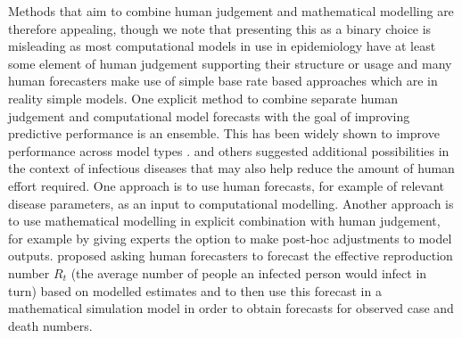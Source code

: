 \documentclass[10pt,a4paper,twocolumn]{article}
\begin{document}

Methods that aim to combine human judgement and mathematical modelling are therefore appealing, though we note that presenting this as a binary choice is misleading as most computational models in use in epidemiology have at least some element of human judgement supporting their structure or usage and many human forecasters make use of simple base rate based approaches which are in reality simple models. One explicit method to combine separate human judgement and computational model forecasts with the goal of improving predictive performance is an ensemble. This has been widely shown to improve performance across model types \citep{mcandrewChimericForecastingCombining2022}. \citet{farrowHumanJudgmentApproach2017, bosseComparingHumanModelbased2022, swallowChallengesEstimationUncertainty2022} and others suggested additional possibilities in the context of infectious diseases that may also help reduce the amount of human effort required. One approach is to use human forecasts, for example of relevant disease parameters, as an input to computational modelling. Another approach is to use mathematical modelling in explicit combination with human judgement, for example by giving experts the option to make post-hoc adjustments to model outputs. \citet{bosseComparingHumanModelbased2022} proposed asking human forecasters to forecast the effective reproduction number $R_t$ (the average number of people an infected person would infect in turn) based on modelled estimates and to then use this forecast in a mathematical simulation model in order to obtain forecasts for observed case and death numbers. 
\end{document}

